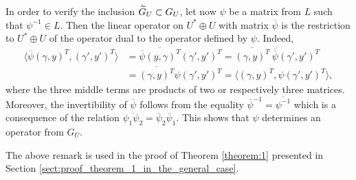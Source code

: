 \documentclass[11pt, a4paper]{article}
\begin{document}
{In order to verify the inclusion $\widetilde G_U\subset G_U$, let now $\psi$ be a matrix from $L$ such that $\psi^{-1}\in L$. Then the linear operator on $U^*\oplus U$ with matrix $\overline{\psi}$ is the restriction to $U^*\oplus U$ of the operator dual to the operator defined by $\psi$. Indeed,
\begin{equation}
\begin{split}
\langle\overline{\psi}(\gamma,y)^T,(\gamma',y')^T\rangle&=\overline{\overline{\psi}(y,\gamma)^T}(\gamma',y')^T=\overline{(\gamma,y)^T}~\overline{\overline{\psi}}(\gamma',y')^T\\
&=\overline{(\gamma,y)^T}\psi(\gamma',y')^T=\langle(\gamma,y)^T,\psi(\gamma',y')^T\rangle,
\end{split}\label{formula:vee_Mackey}
\end{equation}
where the three middle terms are products of two or respectively three matrices.
Moreover, the invertibility of $\overline{\psi}$ follows from the equality $\overline{\psi}^{-1}=\overline{\psi^{-1}}$ which is a consequence of the relation $\overline{\psi_1 \psi_2}=\overline{\psi}_2\overline{\psi}_1$. This shows that $\psi$ determines an operator from $G_U$.
}


The above remark is used in the proof of Theorem \ref{theorem:1} presented in Section \ref{sect:proof_theorem_1_in_the_general_case}.
\end{document}
